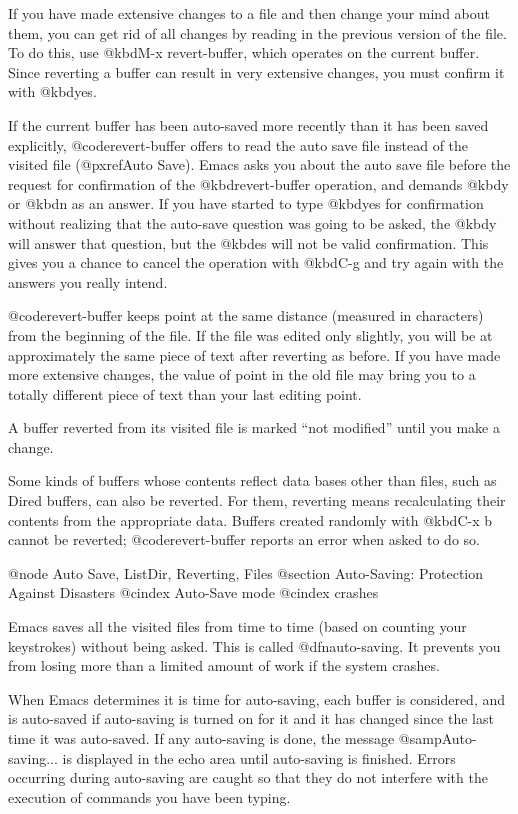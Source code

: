 {{{{{{{{{{{{{{{{{  If you have made extensive changes to a file and then change your mind
about them, you can get rid of all changes by reading in the previous
version of the file.  To do this, use @kbd{M-x revert-buffer}, which
operates on the current buffer.  Since reverting a buffer can result in
very extensive changes, you must confirm it with @kbd{yes}.

  If the current buffer has been auto-saved more recently than it has been
saved explicitly, @code{revert-buffer} offers to read the auto save file
instead of the visited file (@pxref{Auto Save}).  Emacs asks you about
the auto save file before the request for confirmation of the
@kbd{revert-buffer} operation, and demands @kbd{y} or @kbd{n}
as an answer.  If you have started to type @kbd{yes} for confirmation
without realizing that the auto-save question was going to be asked, the
@kbd{y} will answer that question, but the @kbd{es} will not be valid
confirmation.  This gives you a chance to cancel the operation with
@kbd{C-g} and try again with the answers you really intend.

  @code{revert-buffer} keeps point at the same distance (measured in
characters) from the beginning of the file.  If the file was edited only
slightly, you will be at approximately the same piece of text after
reverting as before.  If you have made more extensive changes, the value of
point in the old file may bring you to a totally different piece of text
than your last editing point.

A buffer reverted from its visited file is marked ``not modified'' until
you make a change.

  Some kinds of buffers whose contents reflect data bases other than files,
such as Dired buffers, can also be reverted.  For them, reverting means
recalculating their contents from the appropriate data.  Buffers
created randomly with @kbd{C-x b} cannot be reverted; @code{revert-buffer}
reports an error when asked to do so.

@node Auto Save, ListDir, Reverting, Files
@section Auto-Saving: Protection Against Disasters
@cindex Auto-Save mode
@cindex crashes

  Emacs saves all the visited files from time to time (based on counting
your keystrokes) without being asked.  This is called @dfn{auto-saving}.
It prevents you from losing more than a limited amount of work if the
system crashes.

  When Emacs determines it is time for auto-saving, each buffer is
considered, and is auto-saved if auto-saving is turned on for it and it has
changed since the last time it was auto-saved.  If any auto-saving is
done, the message @samp{Auto-saving...} is displayed in the echo area until
auto-saving is finished.  Errors occurring during auto-saving are caught
so that they do not interfere with the execution of commands you have been
typing.

}}}}}}}}}}}}}}}}}
